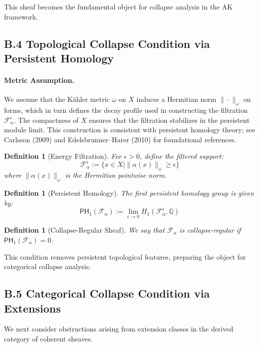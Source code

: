 \documentclass[11pt]{article}
\newtheorem{definition}[theorem]{Definition}
\begin{document}
This sheaf becomes the fundamental object for collapse analysis in the AK framework.

\subsection*{B.4 Topological Collapse Condition via Persistent Homology}

\paragraph{Metric Assumption.}
We assume that the Kähler metric $\omega$ on $X$ induces a Hermitian norm $\|\cdot\|_\omega$ on forms, which in turn defines the decay profile used in constructing the filtration $\mathcal{F}_\alpha^\epsilon$. The compactness of $X$ ensures that the filtration stabilizes in the persistent module limit. This construction is consistent with persistent homology theory; see Carlsson (2009) and Edelsbrunner–Harer (2010) for foundational references.

\begin{definition}[Energy Filtration]
For $\epsilon > 0$, define the filtered support:
\[
\mathcal{F}_\alpha^\epsilon := \{ x \in X \mid \| \alpha(x) \|_\omega \geq \epsilon \}
\]
where $\| \alpha(x) \|_\omega$ is the Hermitian pointwise norm.
\end{definition}

\begin{definition}[Persistent Homology]
The first persistent homology group is given by:
\[
\mathsf{PH}_1(\mathcal{F}_\alpha) := \lim_{\epsilon \to 0} H_1(\mathcal{F}_\alpha^\epsilon, \mathbb{Q})
\]
\end{definition}

\begin{definition}[Collapse-Regular Sheaf]
We say that $\mathcal{F}_\alpha$ is \emph{collapse-regular} if $\mathsf{PH}_1(\mathcal{F}_\alpha) = 0$.
\end{definition}

This condition removes persistent topological features, preparing the object for categorical collapse analysis.

\subsection*{B.5 Categorical Collapse Condition via Extensions}

We next consider obstructions arising from extension classes in the derived category of coherent sheaves.
\end{document}
